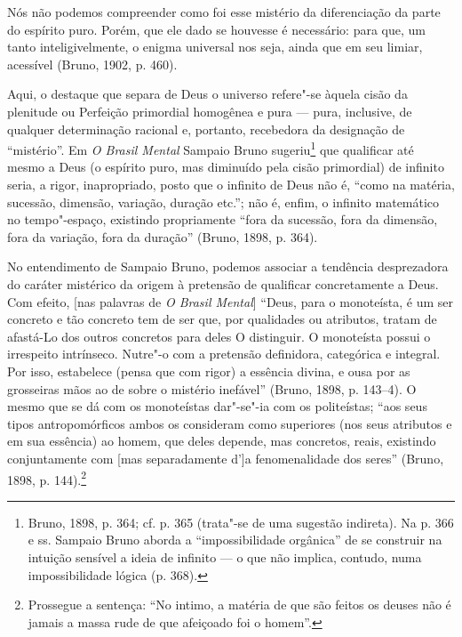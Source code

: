 Nós não podemos compreender como foi esse mistério da
diferenciação da parte do espírito puro. Porém, que ele dado se
houvesse é necessário: para que, um tanto inteligivelmente, o
enigma universal nos seja, ainda que em seu limiar, acessível
(Bruno, 1902, p. 460).

Aqui, o destaque que separa de Deus o universo refere"-se àquela
cisão da plenitude ou Perfeição primordial homogênea e pura ---
pura, inclusive, de qualquer determinação racional e, portanto,
recebedora da designação de “mistério”. Em \emph{O Brasil
Mental} Sampaio Bruno sugeriu\footnote{ Bruno, 1898, p. 364; cf.
p. 365 (trata"-se de uma sugestão indireta). Na p. 366 e ss.
Sampaio Bruno aborda a “impossibilidade orgânica” de se
construir na intuição sensível a ideia de infinito --- o que não
implica, contudo, numa impossibilidade lógica (p. 368).} que
qualificar até mesmo a Deus (o espírito puro, mas diminuído pela
cisão primordial) de infinito seria, a rigor, inapropriado,
posto que o infinito de Deus não é, “como na matéria, sucessão,
dimensão, variação, duração etc.”; não é, enfim, o infinito
matemático no tempo"-espaço, existindo propriamente “fora da
sucessão, fora da dimensão, fora da variação, fora da duração”
(Bruno, 1898, p. 364).

No entendimento de Sampaio Bruno, podemos associar a
tendência desprezadora do caráter mistérico da origem à
pretensão de qualificar concretamente a Deus. Com efeito, [nas
palavras de \emph{O Brasil Mental}] “Deus, para o monoteísta,
é um ser concreto e tão concreto tem de ser que, por qualidades
ou atributos, tratam de afastá-Lo dos outros concretos para
deles O distinguir. O monoteísta possui o irrespeito intrínseco.
Nutre"-o com a pretensão definidora, categórica e integral. Por
isso, estabelece (pensa que com rigor) a essência divina, e ousa
por as grosseiras mãos ao de sobre o mistério inefável” (Bruno,
1898, p. 143--4). O mesmo que se dá com os monoteístas dar"-se"-ia
com os politeístas; “aos seus tipos antropomórficos ambos os
consideram como superiores (nos seus atributos e em sua
essência) ao homem, que deles depende, mas concretos, reais,
existindo conjuntamente com [mas separadamente d']a
fenomenalidade dos seres” (Bruno, 1898, p. 144).\footnote{
Prossegue a sentença: “No intimo, a matéria de que são feitos os
deuses não é jamais a massa rude de que afeiçoado foi o
homem”.}

